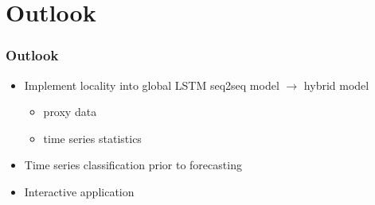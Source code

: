 \documentclass[10pt]{beamer}
\theoremstyle{remark}
\theoremstyle{definition}
\begin{document}
\section{Outlook}
\begin{frame}	
\frametitle{Outlook}

	\begin{itemize}[<+->]
		\item Implement locality into global LSTM seq2seq model $\rightarrow$ hybrid model
		\begin{itemize}
			\item proxy data
			\item time series statistics
		\end{itemize}   
		\item Time series classification prior to forecasting  
		\item Interactive application  
	\end{itemize}

\end{frame}
\end{document}

